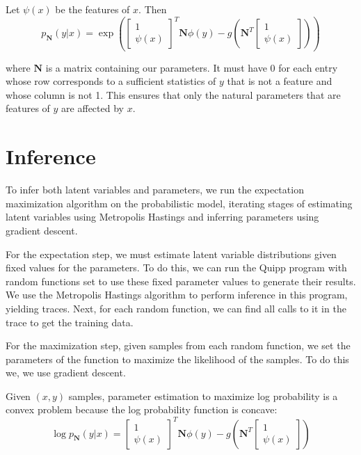 \documentclass{article}
\begin{document}
    Let $\psi(x)$ be the features of $x$.  Then
    $$p_{\mathbf{N}}(y | x) = \exp\left(\begin{bmatrix} 1 \\ \psi(x) \end{bmatrix} ^T \mathbf{N} \phi(y) - g\left(\mathbf{N}^T \begin{bmatrix} 1 \\ \psi(x) \end{bmatrix}\right)\right)$$

    where $\mathbf{N}$ is a matrix containing our parameters.  It must have 0 for each entry whose row corresponds
    to a sufficient statistics of $y$ that is not a feature and whose column is not 1.
    This ensures that only the
    natural parameters that are features of $y$ are affected by $x$.


  \section{Inference}

    To infer both latent variables and parameters, we run the
    expectation maximization algorithm on the probabilistic model, iterating stages of
    estimating latent variables using Metropolis Hastings and inferring
    parameters using gradient descent.

    For the expectation step, we must estimate latent variable distributions given
    fixed values for the parameters.  To do this, we can run the Quipp program
    with random functions set to use these fixed parameter values to generate their results.
    We use the Metropolis Hastings algorithm to perform inference in this program,
    yielding traces.  Next, for each random function, we can find all calls
    to it in the trace to get the training data.

    For the maximization step, given samples from each random function, we set the
    parameters of the function to maximize the likelihood of the samples.  To do this we,
    we use gradient descent.

    Given $(x, y)$ samples, parameter estimation to maximize log probability is a convex
    problem because the log probability function is concave:
    $$\log p_{\mathbf{N}}(y | x) = \begin{bmatrix} 1 \\ \psi(x) \end{bmatrix} ^T \mathbf{N} \phi(y) - g\left(\mathbf{N}^T \begin{bmatrix} 1 \\ \psi(x) \end{bmatrix}\right)$$
\end{document}
